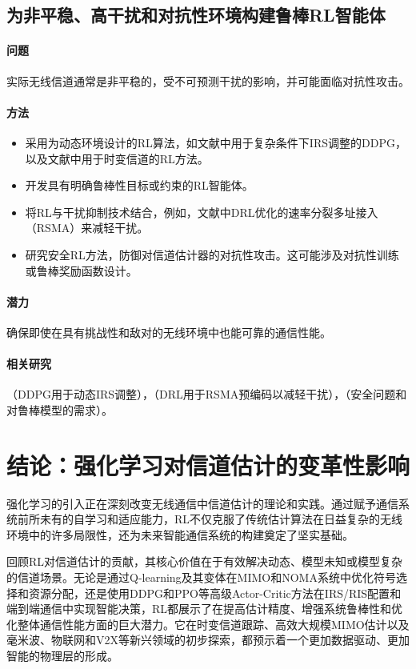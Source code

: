 \documentclass[journal]{IEEEtran}
\begin{document}
\subsection{为非平稳、高干扰和对抗性环境构建鲁棒RL智能体}

\paragraph{问题} 
实际无线信道通常是非平稳的，受不可预测干扰的影响，并可能面临对抗性攻击\cite{ref1}。

\paragraph{方法}
\begin{itemize}
\item 采用为动态环境设计的RL算法，如文献\cite{ref1}中用于复杂条件下IRS调整的DDPG，以及文献\cite{ref12}中用于时变信道的RL方法。
\item 开发具有明确鲁棒性目标或约束的RL智能体。
\item 将RL与干扰抑制技术结合，例如，文献\cite{ref58}中DRL优化的速率分裂多址接入（RSMA）来减轻干扰。
\item 研究安全RL方法，防御对信道估计器的对抗性攻击\cite{ref4}。这可能涉及对抗性训练或鲁棒奖励函数设计。
\end{itemize}

\paragraph{潜力} 
确保即使在具有挑战性和敌对的无线环境中也能可靠的通信性能。

\paragraph{相关研究} 
\cite{ref1}（DDPG用于动态IRS调整），\cite{ref58}（DRL用于RSMA预编码以减轻干扰），\cite{ref4}（安全问题和对鲁棒模型的需求）。

\section{结论：强化学习对信道估计的变革性影响}

强化学习的引入正在深刻改变无线通信中信道估计的理论和实践。通过赋予通信系统前所未有的自学习和适应能力，RL不仅克服了传统估计算法在日益复杂的无线环境中的许多局限性，还为未来智能通信系统的构建奠定了坚实基础。

回顾RL对信道估计的贡献，其核心价值在于有效解决动态、模型未知或模型复杂的信道场景。无论是通过Q-learning及其变体在MIMO和NOMA系统中优化符号选择和资源分配\cite{ref15}，还是使用DDPG和PPO等高级Actor-Critic方法在IRS/RIS配置\cite{ref1}和端到端通信\cite{ref10}中实现智能决策，RL都展示了在提高估计精度、增强系统鲁棒性和优化整体通信性能方面的巨大潜力。它在时变信道跟踪\cite{ref12}、高效大规模MIMO估计\cite{ref13}以及毫米波、物联网和V2X\cite{ref9}等新兴领域的初步探索，都预示着一个更加数据驱动、更加智能的物理层的形成。
\end{document}

